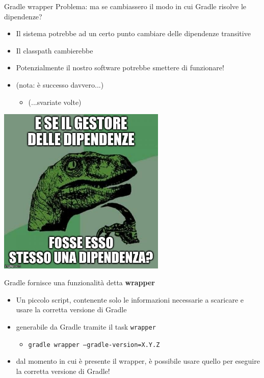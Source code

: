 \documentclass[presentation]{beamer}
\begin{document}
\begin{frame}[allowframebreaks]{Gradle wrapper}
    Problema: ma se cambiassero il modo in cui Gradle risolve le dipendenze?
    \begin{itemize}
        \item Il sistema potrebbe ad un certo punto cambiare delle dipendenze transitive
        \item Il classpath cambierebbe
        \item Potenzialmente il nostro software potrebbe smettere di funzionare!
        \item (nota: è successo davvero...)
        \begin{itemize}
            \item (...svariate volte)
        \end{itemize}
    \end{itemize}
    \begin{center}
        \includegraphics[width=0.6\textwidth]{img/philosoraptor}
    \end{center}
    Gradle fornisce una funzionalità detta \textbf{wrapper}
    \begin{itemize}
        \item Un piccolo script, contenente solo le informazioni necessarie a scaricare e usare la corretta versione di Gradle
        \item generabile da Gradle tramite il task \texttt{wrapper}
        \begin{itemize}
            \item \texttt{gradle wrapper --gradle-version=X.Y.Z}
        \end{itemize}
        \item dal momento in cui è presente il wrapper, è possibile usare quello per eseguire la corretta versione di Gradle!

\end{itemize}
\end{frame}
\end{document}
